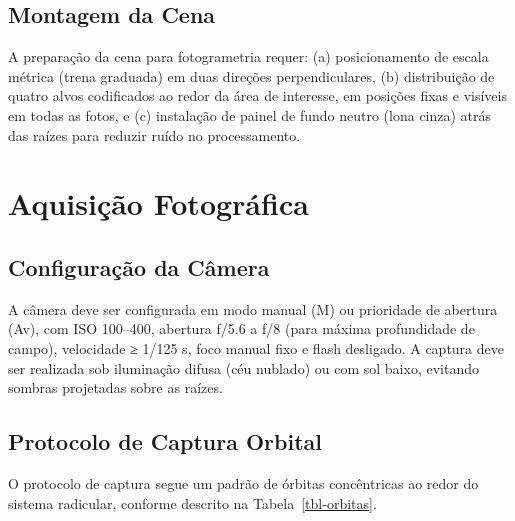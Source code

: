 \documentclass[
  portuguese,
  11pt,
  a4paper,
  open=any]{scrbook}
\begin{document}
\subsection{Montagem da Cena}\label{montagem-da-cena}

A preparação da cena para fotogrametria requer: (a) posicionamento de
escala métrica (trena graduada) em duas direções perpendiculares, (b)
distribuição de quatro alvos codificados ao redor da área de interesse,
em posições fixas e visíveis em todas as fotos, e (c) instalação de
painel de fundo neutro (lona cinza) atrás das raízes para reduzir ruído
no processamento.

\section{Aquisição Fotográfica}\label{aquisiuxe7uxe3o-fotogruxe1fica}

\subsection{Configuração da
Câmera}\label{configurauxe7uxe3o-da-cuxe2mera}

A câmera deve ser configurada em modo manual (M) ou prioridade de
abertura (Av), com ISO 100--400, abertura f/5.6 a f/8 (para máxima
profundidade de campo), velocidade ≥ 1/125 s, foco manual fixo e flash
desligado. A captura deve ser realizada sob iluminação difusa (céu
nublado) ou com sol baixo, evitando sombras projetadas sobre as raízes.

\subsection{Protocolo de Captura
Orbital}\label{protocolo-de-captura-orbital}

O protocolo de captura segue um padrão de órbitas concêntricas ao redor
do sistema radicular, conforme descrito na Tabela~\ref{tbl-orbitas}.
\end{document}
